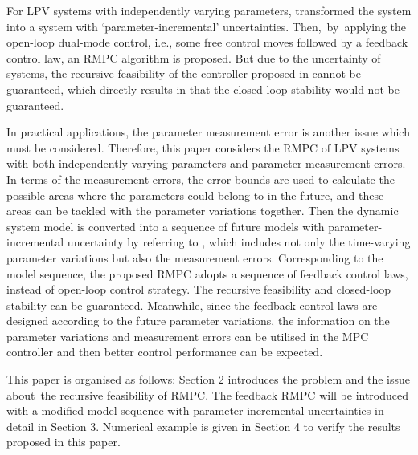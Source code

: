 \documentclass{singlecol-new}
\theoremstyle{TH}{
\newtheorem{lemma}{Lemma}
\newtheorem{theorem}[lemma]{Theorem}
\newtheorem{corrolary}[lemma]{Corrolary}
\newtheorem{conjecture}[lemma]{Conjecture}
\newtheorem{proposition}[lemma]{Proposition}
\newtheorem{claim}[lemma]{Claim}
\newtheorem{stheorem}[lemma]{Wrong Theorem}
\newtheorem{algorithm}{Algorithm}
}
\theoremstyle{THrm}{
\newtheorem{definition}{Definition}[section]
\newtheorem{question}{Question}[section]
\newtheorem{remark}{Remark}
\newtheorem{scheme}{Scheme}
}
\theoremstyle{THhit}{
\newtheorem{case}{Case}[section]
}
\begin{document}
For LPV systems with independently varying parameters,
\cite{park2004crl} transformed the system into a system with
`parameter-incremental' uncertainties. Then,~by~applying the
open-loop dual-mode control, i.e., some free control moves followed
by a feedback control law, an RMPC algorithm is proposed. But due to
the uncertainty of systems, the recursive feasibility of the
controller proposed in \cite{park2004crl} cannot be guaranteed,
which directly results in that the closed-loop stability would not
be guaranteed.

In practical applications, the parameter measurement error is
another issue which must be considered. Therefore, this paper
considers the RMPC of LPV systems with both independently varying
parameters and parameter measurement errors. In terms of the
measurement errors, the error bounds are used to calculate the
possible areas where the parameters could belong to in the future,
and these areas can be tackled with the parameter variations
together. Then the dynamic system model is converted into a sequence
of future models with parameter-incremental uncertainty by referring
to \cite{park2004crl}, which includes not only the time-varying
parameter variations but also the measurement errors. Corresponding
to the model sequence, the proposed RMPC adopts a sequence of
feedback control laws, instead of open-loop control strategy. The
recursive feasibility and closed-loop stability can be guaranteed.
Meanwhile, since the feedback control laws are designed according to
the future parameter variations, the information on the parameter
variations and measurement errors can be utilised in the MPC
controller and then better control performance can be expected.

This paper is organised as follows: Section 2 introduces the problem
and the issue about~the recursive feasibility of RMPC. The feedback
RMPC will be introduced with a modified model sequence with
parameter-incremental uncertainties in detail in Section 3.
Numerical example is given in Section 4 to verify the results
proposed in this paper.\vvp{}
\end{document}

